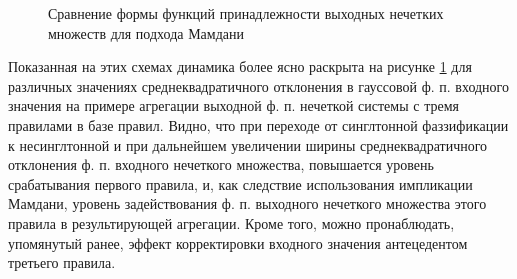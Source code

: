 \begin{figure}[ht]
\begin{subfigure}[b]{\textwidth}
    \end{subfigure}
    \caption{Сравнение формы функций принадлежности выходных нечетких множеств для подхода Мамдани}
    \label{fig:ns-width-influence-to-out-mamdani}
\end{figure}

Показанная на этих схемах динамика более ясно раскрыта на рисунке \cref{fig:ns-width-influence-to-out-mamdani} для различных значениях среднеквадратичного отклонения в гауссовой ф. п. входного значения на примере агрегации выходной ф. п. нечеткой системы с тремя правилами в базе правил. Видно, что при переходе от синглтонной фаззификации к несинглтонной и при дальнейшем увеличении ширины среднеквадратичного отклонения ф. п. входного нечеткого множества, повышается уровень срабатывания первого правила, и, как следствие использования импликации Мамдани, уровень задействования ф. п. выходного нечеткого множества этого правила в результирующей агрегации. Кроме того, можно пронаблюдать, упомянутый ранее, эффект корректировки входного значения антецедентом третьего правила.

